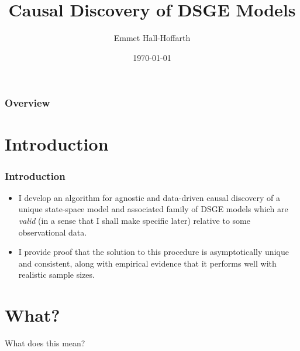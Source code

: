 \documentclass{beamer}
\title[Causal Discovery DSGE]{Causal Discovery of DSGE Models} %
\author{Emmet Hall-Hoffarth} %
\institute[Oxford] %
{
University of Oxford \\ %
\medskip
\textit{emmet.hall-hoffarth@economics.ox.ac.uk} %
}
\date{\today} %
\begin{document}
\begin{frame}
    \titlepage %
\end{frame}

\begin{frame}
    \frametitle{Overview} %
    \tableofcontents %
\end{frame}

\section{Introduction}

\begin{frame}
    \frametitle{Introduction}
    \begin{itemize}
        \item I develop an algorithm for agnostic and data-driven causal discovery of a unique state-space model and associated family of DSGE models which are \textit{valid} (in a sense that I shall make specific later) relative to some observational data.
        \item I provide proof that the solution to this procedure is asymptotically unique and consistent, along with empirical evidence that it performs well with realistic sample sizes.
    \end{itemize}
\end{frame}

\section{What?}

\begin{frame}
    \centering
    \huge
    What does this mean?
\end{frame}
\end{document}
